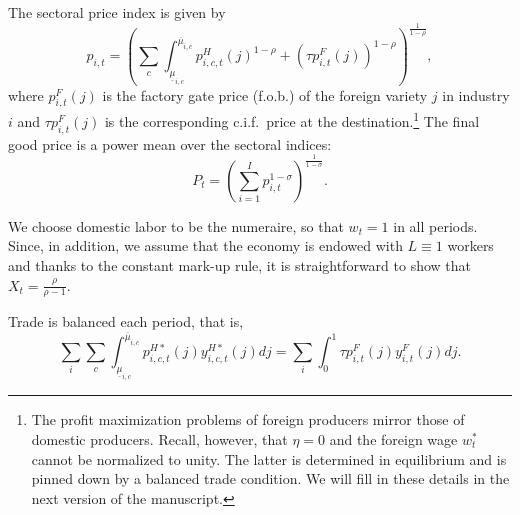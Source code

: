 \documentclass[onehalfspacing,11pt]{article}
\begin{document}
The sectoral price index is given by
\begin{equation}
\label{ }
p_{i,t} = \left( \sum_c \int_{\underline{\mu}_{i,c}}^{\overline{\mu}_{i,c}} p_{i,c,t}^H(j)^{1-\rho} + \left( \tau p_{i,t}^F(j) \right)^{1-\rho} \right)^{\frac{1}{1-\rho}},
\end{equation}
where $p_{i,t}^F(j)$ is the factory gate price (f.o.b.) of the foreign variety $j$ in industry $i$ and $\tau p_{i,t}^F(j)$ is the corresponding c.i.f.~price at the destination.\footnote{The profit maximization problems of foreign producers mirror those of domestic producers. Recall, however, that $\eta=0$ and the foreign wage $w_t^*$ cannot be normalized to unity. The latter is determined in equilibrium and is pinned down by a balanced trade condition. We will fill in these details in the next version of the manuscript.} The final good price is a power mean over the sectoral indices:
\begin{equation}
\label{ }
P_t = \left( \sum_{i=1}^I p_{i,t}^{1-\sigma} \right)^{\frac{1}{1-\sigma}}.
\end{equation}


We choose domestic labor to be the numeraire, so that $w_t=1$ in all periods. Since, in addition, we assume that the economy is endowed with $L \equiv 1$ workers and thanks to the constant mark-up rule, it is straightforward to show that $X_t = \frac{\rho}{\rho-1}$.

Trade is balanced each period, that is,
\begin{equation}
\sum_i \sum_c \int_{\underline{\mu}_{i,c}}^{\overline{\mu}_{i,c}} p_{i,c,t}^{H*}(j)  y_{i,c,t}^{H*}(j) dj = 
\sum_i \int_0^1 \tau p_{i,t}^{F}(j) y_{i,t}^{F}(j) dj.  \label{eq:trade_balance}
\end{equation}
\end{document}
